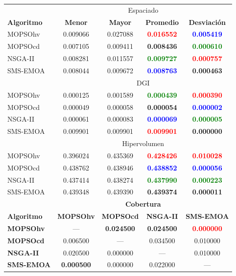    \clearpage
   \newpage

\begin{table}
 \begin{center}
  \begin{tabular}{|l|cc|cc|} \hline
    & \multicolumn{4}{|c|}{Espaciado} \\ 
	\textbf{Algoritmo} & \textbf{Menor} & \textbf{Mayor} & \textbf{Promedio} & \textbf{Desviaci\'on} \\  \hline \hline
	MOPSOhv &0.009066 & 0.027088 &  \textbf{\textcolor{red}{0.016552}} &  \textbf{\textcolor{blue}{0.005419}}   \\ 
	MOPSOcd &0.007105 & 0.009411 & \textbf{0.008436} & \textbf{\textcolor{green}{ 0.000610 }}  \\ 
	NSGA-II &0.008281 & 0.011557 &  \textbf{\textcolor{green}{0.009727}} &  \textbf{\textcolor{red}{0.000757}}  \\  
	SMS-EMOA &0.008044 & 0.009672 &  \textbf{\textcolor{blue}{0.008763}} &  \textbf{0.000463}  \\  
	\hline\hline
    & \multicolumn{4}{|c|}{DGI} \\ 
	\hline\hline
	MOPSOhv &0.000125 & 0.001589 &  \textbf{\textcolor{green}{0.000439}} & \textbf{\textcolor{red}{ 0.000390}}   \\ 
	MOPSOcd &0.000049 & 0.000058 & \textbf{0.000054} &  \textbf{\textcolor{blue}{0.000002}} \\ 
	NSGA-II &0.000061 & 0.000083 &  \textbf{\textcolor{blue}{0.000069}} &  \textbf{\textcolor{green}{0.000005}}   \\  
	SMS-EMOA &0.009901 & 0.009901 & \textbf{\textcolor{red}{ 0.009901}} &  \textbf{0.000000}   \\  
	\hline
    & \multicolumn{4}{|c|}{Hipervolumen} \\ 
	\hline\hline
	MOPSOhv &0.396024 & 0.435369 &  \textbf{\textcolor{red}{0.428426}} &  \textbf{\textcolor{red}{0.010028}}   \\ 
	MOPSOcd &0.438762 & 0.438946 & \textbf{\textcolor{blue}{0.438852}} &  \textbf{\textcolor{blue}{0.000056}}  \\ 
	NSGA-II &0.437414 & 0.438274 &  \textbf{\textcolor{green}{0.437990}} &  \textbf{\textcolor{green}{0.000223}}  \\  
	SMS-EMOA &0.439348 & 0.439390 & \textbf{0.439374} & \textbf{0.000011}   \\  
	\hline\hline
	& \multicolumn{4}{|c|}{\textbf{Cobertura}} \\ \hline\hline 
	\textbf{Algoritmo} & \textbf{MOPSOhv} & \textbf{MOPSOcd} & \textbf{NSGA-II} & \textbf{SMS-EMOA} \\  \hline \hline
	\textbf{MOPSOhv} &---       & \textbf{0.024500}   &   \textbf{0.024500}  &   \textbf{\textcolor{red}{0.000000}}   \\ 
	\textbf{MOPSOcd} & 0.006500 & ---        &  0.034500 &  0.010000 \\ 
	\textbf{NSGA-II} & 0.020500 &  0.000000  & ---       & 0.010000  \\  
	\textbf{SMS-EMOA}& \textbf{0.000500} &  0.000000  & 0.022000  & --- \\  
	\hline


\end{tabular}
\end{center}
\end{table}

